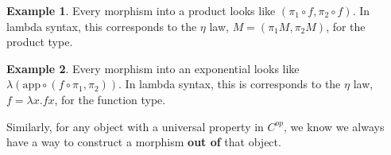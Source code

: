 \documentclass[12pt]{article}
\theoremstyle{definition}
\newtheorem{example}{Example}[section]
\newcommand{\app}{\mathrm{app}}
\begin{document}
\begin{example}
    Every morphism into a product looks like $(\pi_1 \circ f, \pi_2 \circ f)$.
    In lambda syntax, this corresponds to the $\eta$ law, $M = (\pi_1 M, \pi_2 M)$, for the product type.

    \begin{figure}[!h]
        \centering
    
    \end{figure}

\end{example}

\begin{example}
    Every morphism into an exponential looks like $\lambda(\app \circ (f \circ \pi_1, \pi_2))$.
    In lambda syntax, this is corresponds to the $\eta$ law, $f = \lambda x. fx$, for the function type. 
    \begin{figure}[!h]

    \centering
    
\end{figure}

\end{example}
Similarly, for any object with a universal property in $C^{op}$, we know we always have a way to construct a morphism \textbf{out of} that object.
\end{document}
